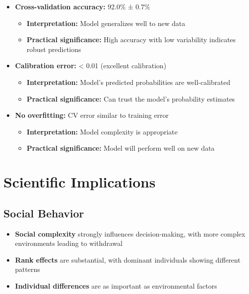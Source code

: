 \documentclass[11pt]{article}
\begin{document}
\begin{itemize}
    \item \textbf{Cross-validation accuracy:} 92.0\% ± 0.7\%
    \begin{itemize}
        \item \textbf{Interpretation:} Model generalizes well to new data
        \item \textbf{Practical significance:} High accuracy with low variability indicates robust predictions
    \end{itemize}
    
    \item \textbf{Calibration error:} < 0.01 (excellent calibration)
    \begin{itemize}
        \item \textbf{Interpretation:} Model's predicted probabilities are well-calibrated
        \item \textbf{Practical significance:} Can trust the model's probability estimates
    \end{itemize}
    
    \item \textbf{No overfitting:} CV error similar to training error
    \begin{itemize}
        \item \textbf{Interpretation:} Model complexity is appropriate
        \item \textbf{Practical significance:} Model will perform well on new data
    \end{itemize}
\end{itemize}

\section{Scientific Implications}

\subsection{Social Behavior}
\begin{itemize}
    \item \textbf{Social complexity} strongly influences decision-making, with more complex environments leading to withdrawal
    \item \textbf{Rank effects} are substantial, with dominant individuals showing different patterns
    \item \textbf{Individual differences} are as important as environmental factors
\end{itemize}
\end{document}
